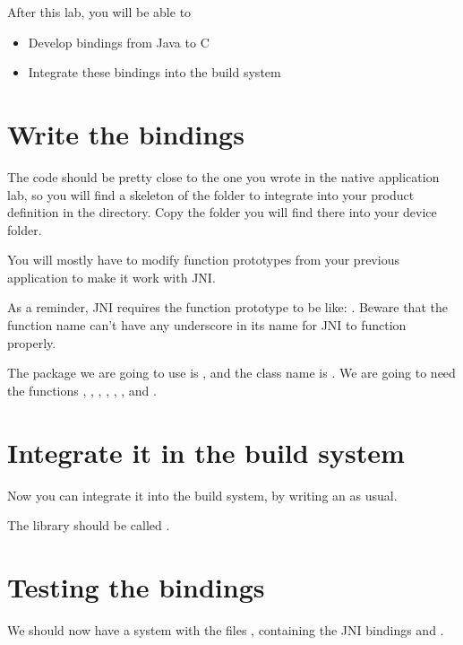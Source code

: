 
After this lab, you will be able to
\begin{itemize}
  \item Develop bindings from Java to C
  \item Integrate these bindings into the build system
\end{itemize}

\section{Write the bindings}

The code should be pretty close to the one you wrote in the native
application lab, so you will find a skeleton of the folder to
integrate into your product definition in the
 directory. Copy the 
folder you will find there into your device folder.

You will mostly have to modify function prototypes from your previous
application to make it work with JNI.

As a reminder, JNI requires the function prototype to be like:
.
Beware that the function name can't have any underscore in its name
for JNI to function properly.

The package we are going to use is , and
the class name is . We are going to need the
functions , , , ,
, ,  and .

\section{Integrate it in the build system}

Now you can integrate it into the build system, by writing an
 as usual.

The library should be called .

\section{Testing the bindings}

We should now have a system with the files
, containing the JNI bindings and
.

